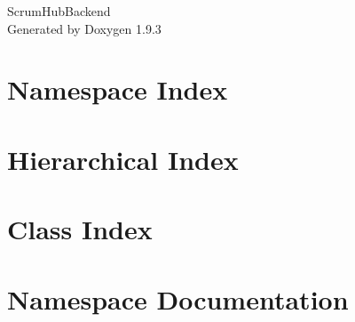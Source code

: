 \documentclass[twoside]{book}
\newcommand{\+}{\discretionary{\mbox{\scriptsize$\hookleftarrow$}}{}{}}
\newcommand{\clearemptydoublepage}{%
    \newpage{\pagestyle{empty}\cleardoublepage}%
  }
\begin{document}
  \raggedbottom
    \hypersetup{pageanchor=false,
                bookmarksnumbered=true,
                pdfencoding=unicode
               }
  \begin{titlepage}
  \vspace*{7cm}
  \begin{center}%
  {\Large Scrum\+Hub\+Backend}\\
  \vspace*{1cm}
  {\large Generated by Doxygen 1.9.3}\\
  \end{center}
  \end{titlepage}
  \clearemptydoublepage
  \tableofcontents
  \clearemptydoublepage
  \hypersetup{pageanchor=true}
\chapter{Namespace Index}

\chapter{Hierarchical Index}

\chapter{Class Index}

\chapter{Namespace Documentation}















\end{document}
